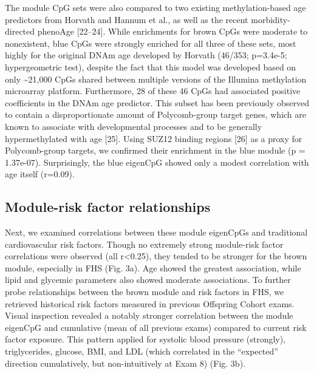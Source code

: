 \documentclass[]{bmcart}
\theoremstyle{definition}
\theoremstyle{definition}
\theoremstyle{definition}
\theoremstyle{remark}
\begin{document}
The module CpG sets were also compared to two existing methylation-based
age predictors from Horvath and Hannum et al., as well as the recent
morbidity-directed phenoAge {[}22--24{]}. While enrichments for brown
CpGs were moderate to nonexistent, blue CpGs were strongly enriched for
all three of these sets, most highly for the original DNAm age developed
by Horvath (46/353; p=3.4e-5; hypergeometric test), despite the fact
that this model was developed based on only \textasciitilde{}21,000 CpGs
shared between multiple versions of the Illumina methylation microarray
platform. Furthermore, 28 of these 46 CpGs had associated positive
coefficients in the DNAm age predictor. This subset has been previously
observed to contain a disproportionate amount of Polycomb-group target
genes, which are known to associate with developmental processes and to
be generally hypermethylated with age {[}25{]}. Using SUZ12 binding
regions {[}26{]} as a proxy for Polycomb-group targets, we confirmed
their enrichment in the blue module (p = 1.37e-07). Surprisingly, the
blue eigenCpG showed only a modest correlation with age itself (r=0.09).

\subsection{Module-risk factor
relationships}\label{module-risk-factor-relationships}

Next, we examined correlations between these module eigenCpGs and
traditional cardiovascular risk factors. Though no extremely strong
module-risk factor correlations were observed (all
\textbar{}r\textbar{}\textless{}0.25), they tended to be stronger for
the brown module, especially in FHS (Fig. 3a). Age showed the greatest
association, while lipid and glycemic parameters also showed moderate
associations. To further probe relationships between the brown module
and risk factors in FHS, we retrieved historical risk factors measured
in previous Offspring Cohort exams. Visual inspection revealed a notably
stronger correlation between the module eigenCpG and cumulative (mean of
all previous exams) compared to current risk factor exposure. This
pattern applied for systolic blood pressure (strongly), triglycerides,
glucose, BMI, and LDL (which correlated in the ``expected'' direction
cumulatively, but non-intuitively at Exam 8) (Fig. 3b).
\end{document}
